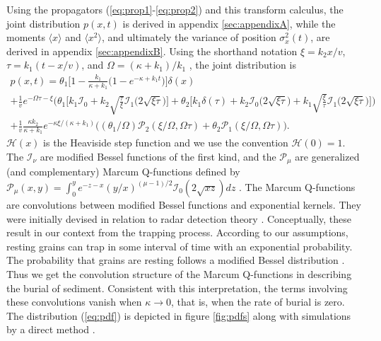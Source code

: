 \documentclass[]{agujournal2018}
\newcommand\bra{\langle}
\newcommand\ket{\rangle}
\begin{document}
Using the propagators (\ref{eq:prop1}-\ref{eq:prop2}) and this transform calculus, the joint distribution $p(x,t)$ is derived in appendix \ref{sec:appendixA}, while the moments $\bra x \ket$ and $\bra x^2 \ket$, and ultimately the variance of position $\sigma_x^2(t)$, are derived in appendix \ref{sec:appendixB}. Using the shorthand notation $\xi = k_2 x/v$, $\tau = k_1(t-x/v)$, and $\Omega = (\kappa+k_1)/k_1$ \citep[c.f.][]{Lisle1998}, the joint distribution is 
\begin{multline}
p(x,t) = \theta_1\Big[1-\frac{k_1}{\kappa+k_1}\Big(1-e^{-{\kappa+k_1}t}\Big)\Big]\delta(x) \\ + \frac{1}{v}e^{-\Omega \tau - \xi}\Big(\theta_1\Big[k_1\mathcal{I}_0 + k_2\sqrt{\frac{\tau}{\xi}}\mathcal{I}_1\big(2\sqrt{\xi\tau}\big)\Big]  + \theta_2\Big[k_1\delta(\tau) + k_2 \mathcal{I}_0\big(2\sqrt{\xi\tau}\big)+k_1 \sqrt{\frac{\xi}{\tau}}\mathcal{I}_1\big(2\sqrt{\xi\tau}\big)\Big]\Big) \\
+ \frac{1}{v}\frac{\kappa k_2}{\kappa + k_1}e^{-\kappa \xi/(\kappa + k_1)}\Big((\theta_1/\Omega)\mathcal{P}_2(\xi/\Omega,\Omega\tau) + \theta_2 \mathcal{P}_1(\xi/\Omega,\Omega\tau)\Big).
\label{eq:pdf}
\end{multline}
$\mathcal{H}(x)$ is the Heaviside step function and we use the convention $\mathcal{H}(0)=1$.
The $\mathcal{I}_\nu$ are modified Bessel functions of the first kind, and the $\mathcal{P}_\mu$ are generalized (and complementary) Marcum Q-functions defined by $\mathcal{P}_\mu(x,y) = \int_0^y e^{-z-x}(y/x)^{(\mu-1)/2}\mathcal{I}_0(2\sqrt{xz})dz $ \citep{Temme1996}. The Marcum Q-functions are convolutions between modified Bessel functions and exponential kernels. They were initially devised in relation to radar detection theory \citep{Marcum1960}. 
Conceptually, these result in our context from the trapping process. According to our assumptions, resting grains can trap in some interval of time with an exponential probability. The probability that grains are resting follows a modified Bessel distribution \citep[e.g.][]{Einstein1937,Lisle1998}.
Thus we get the convolution structure of the Marcum Q-functions in describing the burial of sediment.
Consistent with this interpretation, the terms involving these convolutions vanish when $\kappa \rightarrow 0$, that is, when the rate of burial is zero.
The distribution (\ref{eq:pdf}) is depicted in figure \ref{fig:pdfs} along with simulations by a direct method \citep[c.f.][]{Barik2006}. 
\end{document}

